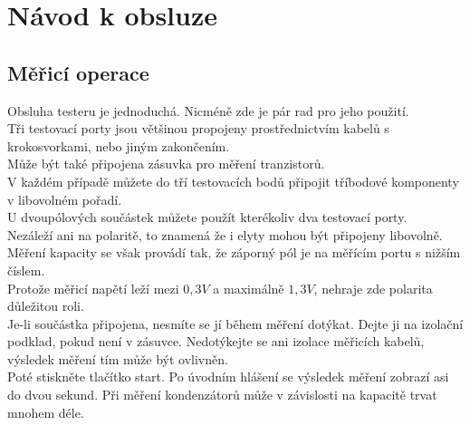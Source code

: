 \chapter{Návod k obsluze}
\label{sec:manual}

\vspace*{-1cm}
\section{Měřicí operace}
\vspace{-0.3cm}
Obsluha testeru je jednoduchá. Nicméně zde je pár rad pro jeho použití.\\
Tři testovací porty jsou většinou propojeny prostřednictvím kabelů s krokosvorkami, nebo jiným zakončením.\\
Může být také připojena zásuvka pro měření tranzistorů.\\
V každém případě můžete do tří testovacích bodů připojit tříbodové komponenty v libovolném pořadí.\\
U dvoupólových součástek můžete použít kterékoliv dva testovací porty.\\
Nezáleží ani na polaritě, to znamená že i elyty mohou být připojeny libovolně.
 Měření kapacity se však provádí tak, že záporný pól je na měřícím portu s nižším číslem.\\
Protože měřicí napětí leží mezi \(0,3V\) a maximálně \(1,3V\), nehraje zde polarita důležitou roli.\\
Je-li součástka připojena, nesmíte se jí během měření dotýkat. Dejte ji na izolační podklad, pokud není v zásuvce. Nedotýkejte se ani izolace měřicích kabelů, výsledek měření tím může být ovlivněn.\\
Poté stiskněte tlačítko start.
Po úvodním hlášení se výsledek měření zobrazí asi do dvou sekund. Při měření kondenzátorů může
v závislosti na kapacitě trvat mnohem déle.\\

